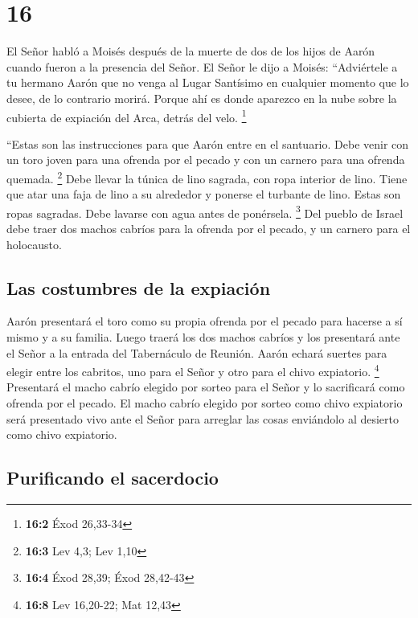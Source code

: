 \hypertarget{section-15}{%
\section{16}\label{section-15}}

 El Señor habló a Moisés después de la muerte de dos de
los hijos de Aarón cuando fueron a la presencia del Señor.
 El Señor le dijo a Moisés: ``Adviértele a tu hermano
Aarón que no venga al Lugar Santísimo en cualquier momento que lo desee,
de lo contrario morirá. Porque ahí es donde aparezco en la nube sobre la
cubierta de expiación del Arca, detrás del velo. \footnote{\textbf{16:2}
  Éxod 26,33-34}

 ``Estas son las instrucciones para que Aarón entre en el
santuario. Debe venir con un toro joven para una ofrenda por el pecado y
con un carnero para una ofrenda quemada. \footnote{\textbf{16:3} Lev
  4,3; Lev 1,10}  Debe llevar la túnica de lino sagrada,
con ropa interior de lino. Tiene que atar una faja de lino a su
alrededor y ponerse el turbante de lino. Estas son ropas sagradas. Debe
lavarse con agua antes de ponérsela. \footnote{\textbf{16:4} Éxod 28,39;
  Éxod 28,42-43}  Del pueblo de Israel debe traer dos
machos cabríos para la ofrenda por el pecado, y un carnero para el
holocausto.

\hypertarget{las-costumbres-de-la-expiaciuxf3n}{%
\subsection{Las costumbres de la
expiación}\label{las-costumbres-de-la-expiaciuxf3n}}

 Aarón presentará el toro como su propia ofrenda por el
pecado para hacerse a sí mismo y a su familia.  Luego
traerá los dos machos cabríos y los presentará ante el Señor a la
entrada del Tabernáculo de Reunión.  Aarón echará suertes
para elegir entre los cabritos, uno para el Señor y otro para el chivo
expiatorio. \footnote{\textbf{16:8} Lev 16,20-22; Mat 12,43}
 Presentará el macho cabrío elegido por sorteo para el
Señor y lo sacrificará como ofrenda por el pecado.  El
macho cabrío elegido por sorteo como chivo expiatorio será presentado
vivo ante el Señor para arreglar las cosas enviándolo al desierto como
chivo expiatorio.

\hypertarget{purificando-el-sacerdocio}{%
\subsection{Purificando el sacerdocio}\label{purificando-el-sacerdocio}}

